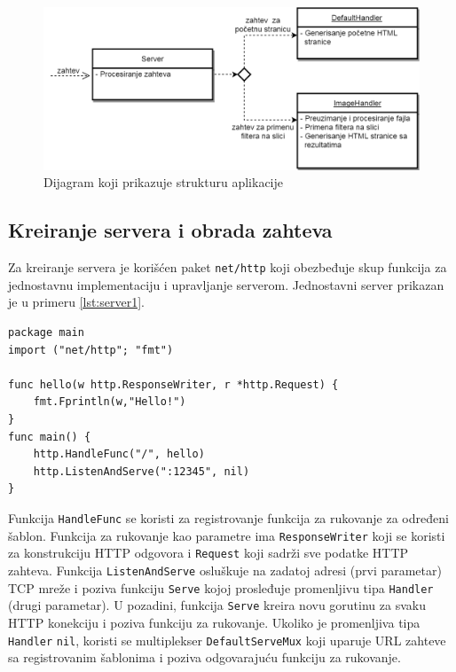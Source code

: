 \documentclass[12pt,oneside]{memoir}
\begin{document}
\begin{figure}
\begin{center}
\includegraphics[scale=0.45]{dijagram.png}
\end{center}
\caption{Dijagram koji prikazuje strukturu aplikacije}
\label{fig:diag}
\end{figure}

\subsection{Kreiranje servera i obrada zahteva}

Za kreiranje servera je korišćen paket \texttt{net/http} koji obezbeđuje skup funkcija za jednostavnu implementaciju i upravljanje serverom. Jednostavni server prikazan je u primeru \ref{lst:server1}. 

\begin{center}
\begin{lstlisting}[caption=Jednostavni server,label={lst:server1},   backgroundcolor=\color{background}]
package main
import ("net/http"; "fmt")

func hello(w http.ResponseWriter, r *http.Request) {
	fmt.Fprintln(w,"Hello!")
}
func main() {
	http.HandleFunc("/", hello)
	http.ListenAndServe(":12345", nil)
}
\end{lstlisting}
\end{center}


Funkcija \texttt{HandleFunc} se koristi za registrovanje funkcija za rukovanje za određeni šablon. Funkcija za rukovanje kao parametre ima \texttt{ResponseWriter} koji se koristi za konstrukciju HTTP odgovora i \texttt{Request} koji sadrži sve podatke HTTP zahteva. Funkcija \texttt{ListenAndServe} osluškuje na zadatoj adresi (prvi parametar) TCP mreže i poziva funkciju \texttt{Serve} kojoj prosleđuje promenljivu tipa \texttt{Handler} (drugi parametar). U pozadini, funkcija \texttt{Serve} kreira novu gorutinu za svaku HTTP konekciju i poziva funkciju za rukovanje. Ukoliko je promenljiva tipa \texttt{Handler} \texttt{nil}, koristi se multiplekser \texttt{DefaultServeMux} koji uparuje URL zahteve sa registrovanim šablonima i poziva odgovarajuću funkciju za rukovanje\cite{http}.
\end{document}
